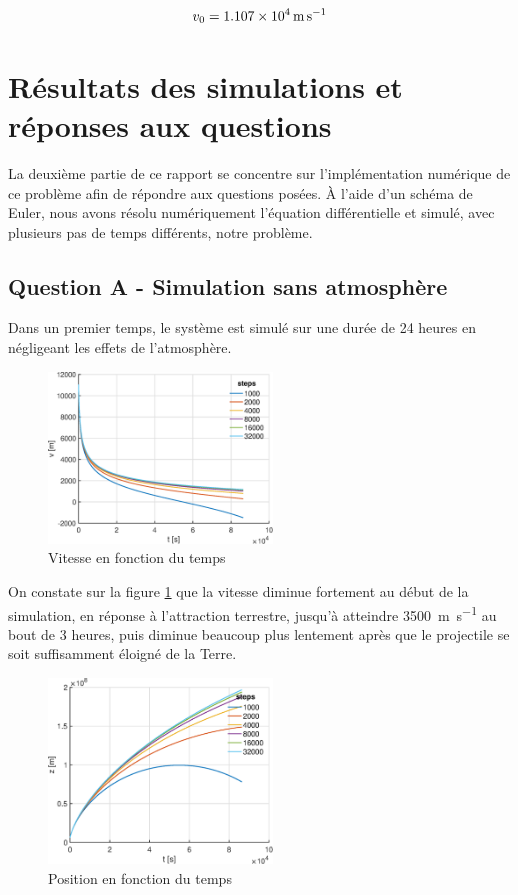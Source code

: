 \documentclass[a4paper,12pt,twoside]{article}
\begin{document}
\begin{equation}
    v_0 = \SI{1.107d4}{\meter\per\second}
    \label{val:v0}
\end{equation}


\section{Résultats des simulations et réponses aux questions}
La deuxième partie de ce rapport se concentre sur l'implémentation numérique de ce problème afin de répondre aux questions posées.
À l'aide d'un schéma de Euler, nous avons résolu numériquement l'équation différentielle et simulé, avec plusieurs pas de temps différents, notre problème.

\subsection{Question A - Simulation sans atmosphère}
Dans un premier temps, le système est simulé sur une durée de 24 heures en négligeant les effets de l'atmosphère.

\begin{figure}[h]
	\centering
    \includegraphics[width=0.53\textwidth]{graphs/vA.eps}
    \caption{Vitesse en fonction du temps}
    \label{fig:A-vt}
\end{figure}

On constate sur la figure \ref{fig:A-vt} que la vitesse diminue fortement au début de la simulation, en réponse à l'attraction terrestre, jusqu'à atteindre \SI{3500}{\meter\per\second} au bout de 3 heures, puis diminue beaucoup plus lentement après que le projectile se soit suffisamment éloigné de la Terre.\\

\begin{figure}[h]
	\centering
	\includegraphics[width=0.53\textwidth]{graphs/zA.eps}
	\caption{Position en fonction du temps}
	\label{fig:A-zt}
\end{figure}
\end{document}
